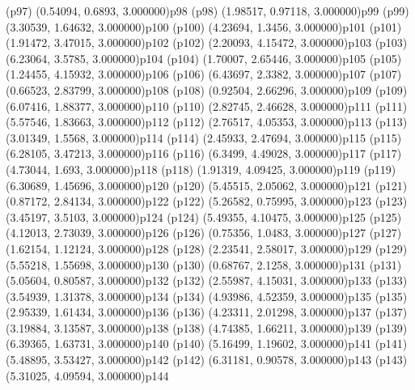 \psdot(p97)
\psPoint(0.54094, 0.6893, 3.000000){p98}
\psdot(p98)
\psPoint(1.98517, 0.97118, 3.000000){p99}
\psdot(p99)
\psPoint(3.30539, 1.64632, 3.000000){p100}
\psdot(p100)
\psPoint(4.23694, 1.3456, 3.000000){p101}
\psdot(p101)
\psPoint(1.91472, 3.47015, 3.000000){p102}
\psdot(p102)
\psPoint(2.20093, 4.15472, 3.000000){p103}
\psdot(p103)
\psPoint(6.23064, 3.5785, 3.000000){p104}
\psdot(p104)
\psPoint(1.70007, 2.65446, 3.000000){p105}
\psdot(p105)
\psPoint(1.24455, 4.15932, 3.000000){p106}
\psdot(p106)
\psPoint(6.43697, 2.3382, 3.000000){p107}
\psdot(p107)
\psPoint(0.66523, 2.83799, 3.000000){p108}
\psdot(p108)
\psPoint(0.92504, 2.66296, 3.000000){p109}
\psdot(p109)
\psPoint(6.07416, 1.88377, 3.000000){p110}
\psdot(p110)
\psPoint(2.82745, 2.46628, 3.000000){p111}
\psdot(p111)
\psPoint(5.57546, 1.83663, 3.000000){p112}
\psdot(p112)
\psPoint(2.76517, 4.05353, 3.000000){p113}
\psdot(p113)
\psPoint(3.01349, 1.5568, 3.000000){p114}
\psdot(p114)
\psPoint(2.45933, 2.47694, 3.000000){p115}
\psdot(p115)
\psPoint(6.28105, 3.47213, 3.000000){p116}
\psdot(p116)
\psPoint(6.3499, 4.49028, 3.000000){p117}
\psdot(p117)
\psPoint(4.73044, 1.693, 3.000000){p118}
\psdot(p118)
\psPoint(1.91319, 4.09425, 3.000000){p119}
\psdot(p119)
\psPoint(6.30689, 1.45696, 3.000000){p120}
\psdot(p120)
\psPoint(5.45515, 2.05062, 3.000000){p121}
\psdot(p121)
\psPoint(0.87172, 2.84134, 3.000000){p122}
\psdot(p122)
\psPoint(5.26582, 0.75995, 3.000000){p123}
\psdot(p123)
\psPoint(3.45197, 3.5103, 3.000000){p124}
\psdot(p124)
\psPoint(5.49355, 4.10475, 3.000000){p125}
\psdot(p125)
\psPoint(4.12013, 2.73039, 3.000000){p126}
\psdot(p126)
\psPoint(0.75356, 1.0483, 3.000000){p127}
\psdot(p127)
\psPoint(1.62154, 1.12124, 3.000000){p128}
\psdot(p128)
\psPoint(2.23541, 2.58017, 3.000000){p129}
\psdot(p129)
\psPoint(5.55218, 1.55698, 3.000000){p130}
\psdot(p130)
\psPoint(0.68767, 2.1258, 3.000000){p131}
\psdot(p131)
\psPoint(5.05604, 0.80587, 3.000000){p132}
\psdot(p132)
\psPoint(2.55987, 4.15031, 3.000000){p133}
\psdot(p133)
\psPoint(3.54939, 1.31378, 3.000000){p134}
\psdot(p134)
\psPoint(4.93986, 4.52359, 3.000000){p135}
\psdot(p135)
\psPoint(2.95339, 1.61434, 3.000000){p136}
\psdot(p136)
\psPoint(4.23311, 2.01298, 3.000000){p137}
\psdot(p137)
\psPoint(3.19884, 3.13587, 3.000000){p138}
\psdot(p138)
\psPoint(4.74385, 1.66211, 3.000000){p139}
\psdot(p139)
\psPoint(6.39365, 1.63731, 3.000000){p140}
\psdot(p140)
\psPoint(5.16499, 1.19602, 3.000000){p141}
\psdot(p141)
\psPoint(5.48895, 3.53427, 3.000000){p142}
\psdot(p142)
\psPoint(6.31181, 0.90578, 3.000000){p143}
\psdot(p143)
\psPoint(5.31025, 4.09594, 3.000000){p144}
